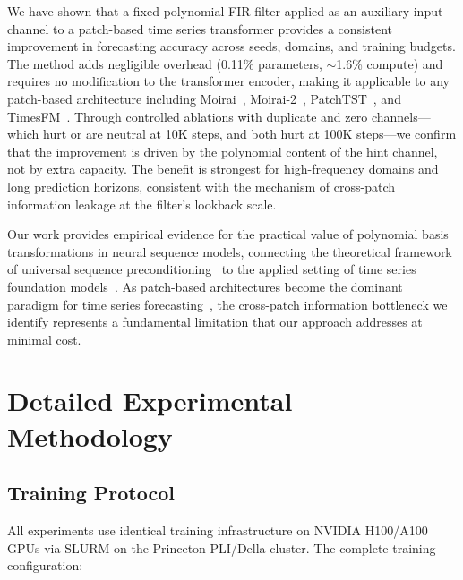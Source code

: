 \documentclass[11pt]{article}
\begin{document}
We have shown that a fixed polynomial FIR filter applied as an auxiliary input channel to a patch-based time series transformer provides a consistent improvement in forecasting accuracy across seeds, domains, and training budgets. The method adds negligible overhead (0.11\% parameters, $\sim$1.6\% compute) and requires no modification to the transformer encoder, making it applicable to any patch-based architecture including Moirai~\citep{woo2024unified}, Moirai-2~\citep{liu2024moirai2}, PatchTST~\citep{nie2023patchtst}, and TimesFM~\citep{das2024decoder}. Through controlled ablations with duplicate and zero channels---which hurt or are neutral at 10K steps, and both hurt at 100K steps---we confirm that the improvement is driven by the polynomial content of the hint channel, not by extra capacity. The benefit is strongest for high-frequency domains and long prediction horizons, consistent with the mechanism of cross-patch information leakage at the filter's lookback scale.

Our work provides empirical evidence for the practical value of polynomial basis transformations in neural sequence models, connecting the theoretical framework of universal sequence preconditioning~\citep{marsden2024universal,hazan2017learning} to the applied setting of time series foundation models~\citep{liang2024foundation}. As patch-based architectures become the dominant paradigm for time series forecasting~\citep{nie2023patchtst,woo2024unified,das2024decoder}, the cross-patch information bottleneck we identify represents a fundamental limitation that our approach addresses at minimal cost.




\appendix
\section{Detailed Experimental Methodology}
\label{app:methodology}

\subsection{Training Protocol}

All experiments use identical training infrastructure on NVIDIA H100/A100 GPUs via SLURM on the Princeton PLI/Della cluster. The complete training configuration:
\end{document}
